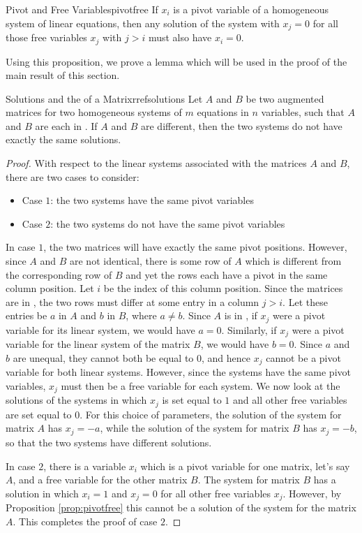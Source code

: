 \begin{proposition}{Pivot and Free Variables}{pivotfree}
  If $x_i$ is a pivot variable of a homogeneous system of linear
  equations, then any solution of the system with $x_j=0$ for all
  those free variables $x_j$ with $j>i$ must also have $x_i=0$.
\end{proposition}

Using this proposition, we prove a lemma which will be used in the
proof of the main result of this section.

\begin{lemma}{Solutions and the {\RREF} of a Matrix}{rrefsolutions}
  Let $A$ and $B$ be two augmented matrices for two homogeneous
  systems of $m$ equations in $n$ variables, such that $A$ and $B$ are
  each in {\rref}. If $A$ and $B$ are different, then the two systems
  do not have exactly the same solutions.
\end{lemma}

\begin{proof}
With respect to the linear systems associated with the matrices $A$ and $B$, there are two cases to consider:
\begin{itemize}
\item Case $1$: the two systems have the same pivot variables
\item Case $2$: the two systems do not have the same pivot variables
\end{itemize}
In case $1$, the two matrices will have exactly the same pivot positions. However, since $A$ and $B$ are not identical, there is some row of $A$ which is different from the corresponding row of $B$ and yet the rows each have a pivot in the same column position. Let $i$ be the index of this column position. Since the matrices are in {\rref}, the two rows must differ at some entry in a column $j>i$. Let these entries be $a$ in $A$ and $b$ in $B$, where $a \neq b$. Since $A$ is in {\rref}, if $x_j$ were a pivot variable for its linear system, we would have $a=0$. Similarly, if $x_j$ were a pivot variable for the linear system of the matrix $B$, we would have $b=0$. Since $a$ and $b$ are unequal, they cannot both be equal to $0$, and hence $x_j$ cannot be a pivot variable for both linear systems. However, since the systems have the same pivot variables, $x_j$ must then be a free variable for each system. We now look at the solutions of the systems in which $x_j$ is set equal to $1$ and all other free variables are set equal to $0$. For this choice of parameters, the solution of the system for matrix $A$ has $x_j=-a$, while the solution of the system for matrix $B$ has $x_j=-b$, so that the two systems have different solutions.

In case $2$, there is a variable $x_i$ which is a pivot variable for one matrix, let's say $A$, and a free variable for the other matrix $B$. The system for matrix $B$ has a solution in which $x_i=1$ and $x_j=0$ for all other free variables $x_j$. However, by Proposition \ref{prop:pivotfree} this cannot be a solution of the system for the matrix $A$. This completes the proof of case $2$.
\end{proof}

